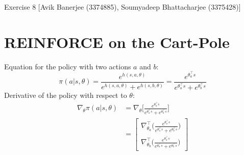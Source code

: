 \documentclass{article}
\begin{document}
\begin{center}
	{\LARGE Exercise 8}\linebreak
	{\large [Avik Banerjee (3374885), Soumyadeep Bhattacharjee (3375428)]}
\end{center}
\section{REINFORCE on the Cart-Pole}
Equation for the policy with two actions $a$ and $b$:
\begin{equation*}
\pi(a|s, \theta) = \frac{e^{h(s,a,\theta)}}{e^{h(s,a,\theta)} + e^{h(s,b,\theta)}} = \frac{e^{\theta_a^\top s}}{e^{\theta_a^\top s} + e^{\theta_b^\top s}}
\end{equation*}
Derivative of the policy with respect to $\theta$:
\begin{equation*}
\begin{split}
\nabla_\theta \pi(a|s, \theta) &= \nabla_\theta\Big[ \frac{e^{\theta_a^\top s}}{e^{\theta_a^\top s} + e^{\theta_b^\top s}}\Big] \\
& = \begin{bmatrix}
\nabla_{\theta_a}^\top \Big(\frac{e^{\theta_a^\top s}}{e^{\theta_a^\top s} + e^{\theta_b^\top s}}\Big) \\
\nabla_{\theta_b}^\top \Big(\frac{e^{\theta_a^\top s}}{e^{\theta_a^\top s} + e^{\theta_b^\top s}} \Big)
\end{bmatrix}
\end{split}
\end{equation*}
\end{document}
